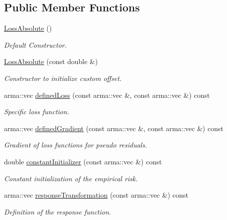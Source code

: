 \subsection*{Public Member Functions}
\begin{DoxyCompactItemize}
\item 
\hyperlink{classloss_1_1_loss_absolute_a7da079d5e12d8970854d10f787fa9602}{Loss\+Absolute} ()
\begin{DoxyCompactList}\small\item\em Default Constructor. \end{DoxyCompactList}\item 
\hyperlink{classloss_1_1_loss_absolute_a5b4faa92b976121bcc5cb6938015ac36}{Loss\+Absolute} (const double \&)
\begin{DoxyCompactList}\small\item\em Constructor to initialize custom offset. \end{DoxyCompactList}\item 
arma\+::vec \hyperlink{classloss_1_1_loss_absolute_af10b320d7253ef4f566530717441059e}{defined\+Loss} (const arma\+::vec \&, const arma\+::vec \&) const
\begin{DoxyCompactList}\small\item\em Specific loss function. \end{DoxyCompactList}\item 
arma\+::vec \hyperlink{classloss_1_1_loss_absolute_a89e530450e42f20fc060ed9141fa8c04}{defined\+Gradient} (const arma\+::vec \&, const arma\+::vec \&) const
\begin{DoxyCompactList}\small\item\em Gradient of loss functions for pseudo residuals. \end{DoxyCompactList}\item 
double \hyperlink{classloss_1_1_loss_absolute_a5272a952bf768a7bd790318b2f9cdcd6}{constant\+Initializer} (const arma\+::vec \&) const
\begin{DoxyCompactList}\small\item\em Constant initialization of the empirical risk. \end{DoxyCompactList}\item 
arma\+::vec \hyperlink{classloss_1_1_loss_absolute_a490d0fdab3e1af9cddbca77b8170263a}{response\+Transformation} (const arma\+::vec \&) const
\begin{DoxyCompactList}\small\item\em Definition of the response function. \end{DoxyCompactList}\end{DoxyCompactItemize}
